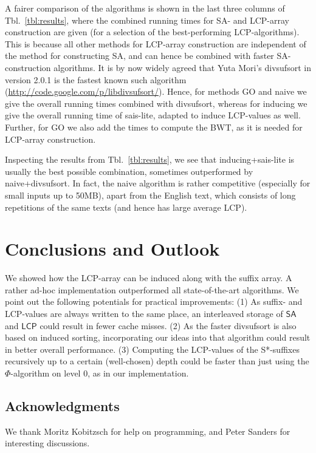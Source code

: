 \documentclass[11pt,onecolumn,final]{article} \usepackage[latin1]{inputenc}
\newcommand{\LCP}[0]{\mathsf{LCP}}
\newcommand{\SA}[0]{\mathsf{SA}}
\theoremstyle{plain}
\theoremstyle{remark}
\begin{document}
A fairer comparison of the algorithms is shown in the last three columns of Tbl.~\ref{tbl:results}, where the combined running times for SA- and LCP-array construction are given (for a selection of the best-performing LCP-algorithms). This is because all other methods for LCP-array construction are independent of the method for constructing SA, and can hence be combined with faster SA-construction algorithms. It is by now widely agreed that Yuta Mori's \textsf{divsufsort} in version 2.0.1 is the fastest known such algorithm (\url{http://code.google.com/p/libdivsufsort/}). Hence, for methods \textsf{GO} and \textsf{naive} we give the overall running times combined with \textsf{divsufsort}, whereas for \textsf{inducing} we give the overall running time of \textsf{sais-lite}, adapted to induce LCP-values as well. Further, for \textsf{GO} we also add the times to compute the BWT, as it is needed for LCP-array construction.

Inspecting the results from Tbl.~\ref{tbl:results}, we see that \textsf{inducing}+\textsf{sais-lite} is usually the best possible combination, sometimes outperformed by \textsf{naive}+\textsf{divsufsort}. In fact, the naive algorithm is rather competitive (especially for small inputs up to 50MB), apart from the English text, which consists of long repetitions of the same texts (and hence has large average LCP).

\section{Conclusions and Outlook}
We showed how the LCP-array can be induced along with the suffix array. A rather ad-hoc implementation outperformed all state-of-the-art algorithms. We point out the following potentials for practical improvements: (1) As suffix- and LCP-values are always written to the same place, an interleaved storage of $\SA$ and $\LCP$ could result in fewer cache misses. (2) As the faster \textsf{divsufsort} is also based on induced sorting, incorporating our ideas into that algorithm could result in better overall performance. (3) Computing the LCP-values of the S*-suffixes recursively up to a certain (well-chosen) depth could be faster than just using the $\Phi$-algorithm on level 0, as in our implementation.

\subsection*{Acknowledgments}
We thank Moritz Kobitzsch for help on programming, and Peter Sanders for interesting discussions.



\end{document}
